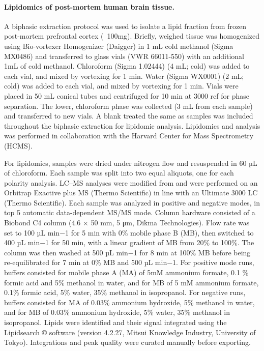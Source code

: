 \paragraph{Lipidomics of post-mortem human brain tissue.}
A biphasic extraction protocol was used to isolate a lipid fraction from frozen post-mortem prefrontal cortex (~100mg). Briefly, weighed tissue was homogenized using Bio-vortexer Homogenizer (Daigger) in 1 mL cold methanol (Sigma MX0486) and transferred to glass vials (VWR 66011-550) with an additional 1mL of cold methanol. Chloroform (Sigma 1.02444) (4 mL; cold) was added to each vial, and mixed by vortexing for 1 min. Water (Sigma WX0001) (2 mL; cold) was added to each vial, and mixed by vortexing for 1 min. Vials were placed in 50 mL conical tubes and centrifuged for 10 min at 3000 rcf for phase separation. The lower, chloroform phase was collected (3 mL from each sample) and transferred to new vials. A blank treated the same as samples was included throughout the biphasic extraction for lipidomic analysis. Lipidomics and analysis was performed in collaboration with the Harvard Center for Mass Spectrometry (HCMS). 

For lipidomics, samples were dried under nitrogen flow and resuspended in 60 µL of chloroform. Each sample was split into two equal aliquots, one for each polarity analysis. LC–MS analyses were modified from \cite{Miraldi2013-go} and were performed on an Orbitrap Exactive plus MS (Thermo Scientific) in line with an Ultimate 3000 LC (Thermo Scientific). Each sample was analyzed in positive and negative modes, in top 5 automatic data-dependent MS/MS mode. Column hardware consisted of a Biobond C4 column (4.6 × 50 mm, 5 μm, Dikma Technologies). Flow rate was set to 100 µL min−1 for 5 min with 0\% mobile phase B (MB), then switched to 400 µL min−1 for 50 min, with a linear gradient of MB from 20\% to 100\%. The column was then washed at 500 µL min−1 for 8 min at 100\% MB before being re-equilibrated for 7 min at 0\% MB and 500 µL min−1. For positive mode runs, buffers consisted for mobile phase A (MA) of 5mM ammonium formate, 0.1 \% formic acid and 5\% methanol in water, and for MB of 5 mM ammonium formate, 0.1\% formic acid, 5\% water, 35\% methanol in isopropanol. For negative runs, buffers consisted for MA of 0.03\% ammonium hydroxide, 5\% methanol in water, and for MB of 0.03\% ammonium hydroxide, 5\% water, 35\% methanol in isopropanol. Lipids were identified and their signal integrated using the Lipidsearch © software (version 4.2.27, Mitsui Knowledge Industry, University of Tokyo). Integrations and peak quality were curated manually before exporting. 
